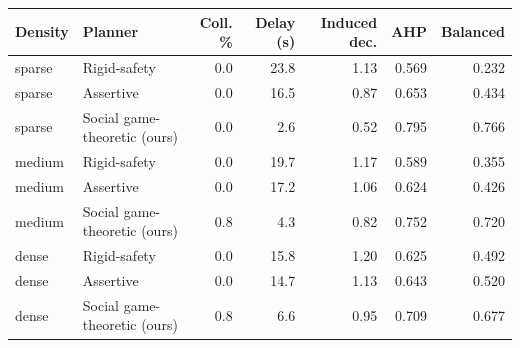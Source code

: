 \begin{tabular}{llrrrrr}
\toprule
Density & Planner & Coll. \% & Delay (s) & Induced dec. & AHP & Balanced \\
\midrule
sparse & Rigid-safety & 0.0 & 23.8 & 1.13 & 0.569 & 0.232 \\
sparse & Assertive & 0.0 & 16.5 & 0.87 & 0.653 & 0.434 \\
sparse & Social game-theoretic (ours) & 0.0 & 2.6 & 0.52 & 0.795 & 0.766 \\
medium & Rigid-safety & 0.0 & 19.7 & 1.17 & 0.589 & 0.355 \\
medium & Assertive & 0.0 & 17.2 & 1.06 & 0.624 & 0.426 \\
medium & Social game-theoretic (ours) & 0.8 & 4.3 & 0.82 & 0.752 & 0.720 \\
dense & Rigid-safety & 0.0 & 15.8 & 1.20 & 0.625 & 0.492 \\
dense & Assertive & 0.0 & 14.7 & 1.13 & 0.643 & 0.520 \\
dense & Social game-theoretic (ours) & 0.8 & 6.6 & 0.95 & 0.709 & 0.677 \\
\bottomrule
\end{tabular}
